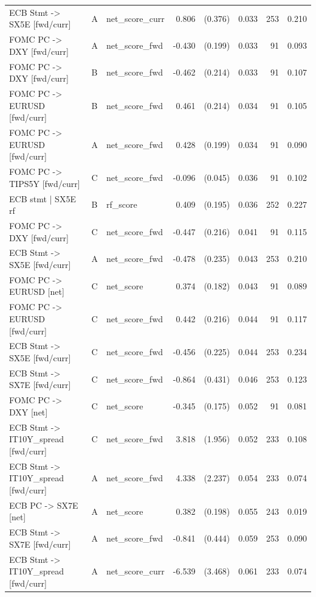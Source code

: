 \begin{table}[H]
\begin{threeparttable}
{\begin{tabular}{lllrrrrr}
ECB Stmt -> SX5E [fwd/curr] & A & net\_score\_curr & 0.806\sym{**} & (0.376) & 0.033 & 253 & 0.210 \\
FOMC PC -> DXY [fwd/curr] & A & net\_score\_fwd & -0.430\sym{**} & (0.199) & 0.033 & 91 & 0.093 \\
FOMC PC -> DXY [fwd/curr] & B & net\_score\_fwd & -0.462\sym{**} & (0.214) & 0.033 & 91 & 0.107 \\
FOMC PC -> EURUSD [fwd/curr] & B & net\_score\_fwd & 0.461\sym{**} & (0.214) & 0.034 & 91 & 0.105 \\
FOMC PC -> EURUSD [fwd/curr] & A & net\_score\_fwd & 0.428\sym{**} & (0.199) & 0.034 & 91 & 0.090 \\
FOMC PC -> TIPS5Y [fwd/curr] & C & net\_score\_fwd & -0.096\sym{**} & (0.045) & 0.036 & 91 & 0.102 \\
ECB stmt | SX5E    rf & B & rf\_score & 0.409\sym{**} & (0.195) & 0.036 & 252 & 0.227 \\
FOMC PC -> DXY [fwd/curr] & C & net\_score\_fwd & -0.447\sym{**} & (0.216) & 0.041 & 91 & 0.115 \\
ECB Stmt -> SX5E [fwd/curr] & A & net\_score\_fwd & -0.478\sym{**} & (0.235) & 0.043 & 253 & 0.210 \\
FOMC PC -> EURUSD [net] & C & net\_score & 0.374\sym{**} & (0.182) & 0.043 & 91 & 0.089 \\
FOMC PC -> EURUSD [fwd/curr] & C & net\_score\_fwd & 0.442\sym{**} & (0.216) & 0.044 & 91 & 0.117 \\
ECB Stmt -> SX5E [fwd/curr] & C & net\_score\_fwd & -0.456\sym{**} & (0.225) & 0.044 & 253 & 0.234 \\
ECB Stmt -> SX7E [fwd/curr] & C & net\_score\_fwd & -0.864\sym{**} & (0.431) & 0.046 & 253 & 0.123 \\
FOMC PC -> DXY [net] & C & net\_score & -0.345\sym{*} & (0.175) & 0.052 & 91 & 0.081 \\
ECB Stmt -> IT10Y\_spread [fwd/curr] & C & net\_score\_fwd & 3.818\sym{*} & (1.956) & 0.052 & 233 & 0.108 \\
ECB Stmt -> IT10Y\_spread [fwd/curr] & A & net\_score\_fwd & 4.338\sym{*} & (2.237) & 0.054 & 233 & 0.074 \\
ECB PC -> SX7E [net] & A & net\_score & 0.382\sym{*} & (0.198) & 0.055 & 243 & 0.019 \\
ECB Stmt -> SX7E [fwd/curr] & A & net\_score\_fwd & -0.841\sym{*} & (0.444) & 0.059 & 253 & 0.090 \\
ECB Stmt -> IT10Y\_spread [fwd/curr] & A & net\_score\_curr & -6.539\sym{*} & (3.468) & 0.061 & 233 & 0.074 \\

\end{tabular}}
\end{threeparttable}
\end{table}
